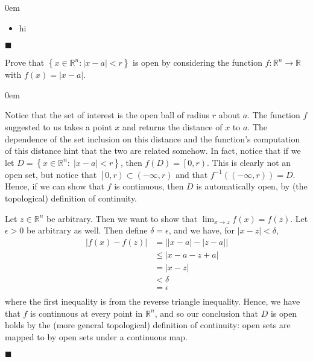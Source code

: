 \documentclass[12pt]{article}
\renewcommand{\qed}{\hfill$\blacksquare$}
\renewenvironment{proof}{\begin{addmargin}[1em]{0em}\begin{newproof}}{\end{newproof}\end{addmargin}\qed}
\newenvironment{problem}[2][Problem]{\begin{trivlist}
\item[\hskip \labelsep {\bfseries #1}\hskip \labelsep {\bfseries #2.}]}{\end{trivlist}}
\begin{document}
\begin{proof}
 \begin{itemize}
 	\item hi
 
 \end{itemize}
\end{proof}
 
 
 
 
 
 
\begin{problem}{1.27}
Prove that $\left\{ x\in \mathbb{R}^n: \left|x-a\right| < r \right\}$ is open by considering the function $f: \mathbb{R}^n\rightarrow \mathbb{R}$ with $f\left(x\right) = \left|x-a\right|$.
\end{problem}
 
\begin{proof}
Notice that the set of interest is the open ball of radius $r$ about $a$. The function $f$ suggested to us takes a point $x$ and returns the distance of $x$ to $a$. The dependence of the set inclusion on this distance and the function's computation of this distance hint that the two are related somehow. In fact, notice that if we let $D=\left\{ x\in \mathbb{R}^n: \; \left|x-a\right|<r\right\}$, then $f\left(D\right) = \left[0,r\right)$. This is clearly not an open set, but notice that $\left[0,r\right) \subset \left(-\infty,r\right)$ and that $f^{-1}\left(\left(-\infty,r\right)\right) = D$. Hence, if we can show that $f$ is continuous, then $D$ is automatically open, by (the topological) definition of continuity.

Let $z\in \mathbb{R}^n$ be arbitrary. Then we want to show that $\lim_{x\rightarrow z} f\left(x\right) = f\left(z\right)$. Let $\epsilon > 0$ be arbitrary as well. Then define $\delta = \epsilon$, and we have, for $\left|x-z\right| < \delta $,
\begin{equation*}
\begin{split}
\left| f\left(x\right) - f\left(z\right) \right| & = \left| \left|x-a\right| - \left|z-a\right| \right| \\
& \leq \left|x-a-  z + a\right| \\
& = \left|x-z\right| \\
& < \delta \\
& = \epsilon \\
\end{split}
\end{equation*}
where the first inequality is from the reverse triangle inequality. Hence, we have that $f$ is continuous at every point in $\mathbb{R}^n$, and so our conclusion that $D$ is open holds by the (more general topological) definition of continuity: open sets are mapped to by open sets under a continuous map.

\end{proof}
 
\end{document}

